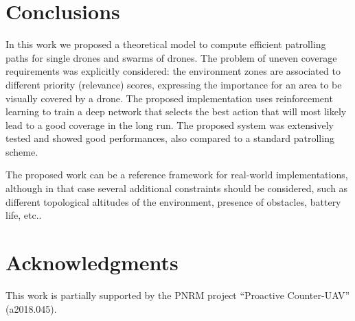 \documentclass{article}
\begin{document}
\section{Conclusions}
In this work we proposed a theoretical model to compute efficient patrolling paths for single drones and swarms of drones. The problem of uneven coverage requirements was explicitly considered: the environment zones are associated to different priority (relevance) scores, expressing the importance for an area to be visually covered by a drone. The proposed implementation uses reinforcement learning to train a deep network that selects the best action that will most likely lead to a good coverage in the long run. The proposed system was extensively tested and showed good performances, also compared to a standard patrolling scheme.

The proposed work can be a reference framework for real-world implementations, although in that case several additional constraints should be considered, such as different topological altitudes of the environment, presence of obstacles, battery life, etc.. 

\section*{Acknowledgments}
This work is partially supported by the PNRM project ``Proactive Counter-UAV'' (a2018.045).





\end{document}
